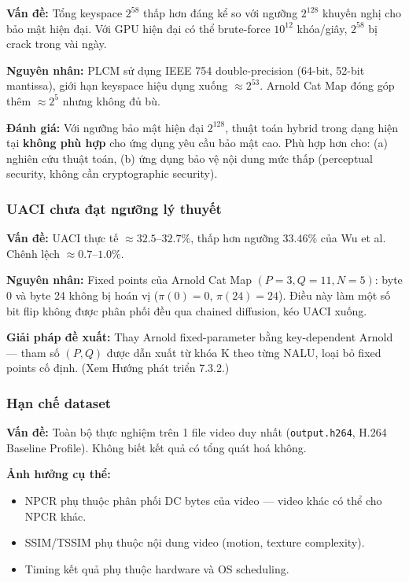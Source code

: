 \textbf{Vấn đề:} Tổng keyspace $2^{58}$ thấp hơn đáng kể so với ngưỡng $2^{128}$
khuyến nghị cho bảo mật hiện đại. Với GPU hiện đại có thể brute-force $10^{12}$
khóa/giây, $2^{58}$ bị crack trong vài ngày.

\textbf{Nguyên nhân:} PLCM sử dụng IEEE 754 double-precision (64-bit, 52-bit mantissa),
giới hạn keyspace hiệu dụng xuống $\approx 2^{53}$.
Arnold Cat Map đóng góp thêm $\approx 2^5$ nhưng không đủ bù.

\textbf{Đánh giá:} Với ngưỡng bảo mật hiện đại $2^{128}$, thuật toán hybrid
trong dạng hiện tại \textbf{không phù hợp} cho ứng dụng yêu cầu bảo mật cao.
Phù hợp hơn cho: (a) nghiên cứu thuật toán, (b) ứng dụng bảo vệ nội dung mức thấp
(perceptual security, không cần cryptographic security).

\subsubsection{UACI chưa đạt ngưỡng lý thuyết}

\textbf{Vấn đề:} UACI thực tế $\approx 32.5$--$32.7\%$, thấp hơn ngưỡng $33.46\%$
của Wu et al. Chênh lệch $\approx 0.7$--$1.0\%$.

\textbf{Nguyên nhân:} Fixed points của Arnold Cat Map $(P=3, Q=11, N=5)$:
byte 0 và byte 24 không bị hoán vị ($\pi(0) = 0$, $\pi(24) = 24$). Điều này
làm một số bit flip không được phân phối đều qua chained diffusion, kéo UACI xuống.

\textbf{Giải pháp đề xuất:} Thay Arnold fixed-parameter bằng key-dependent Arnold
--- tham số $(P, Q)$ được dẫn xuất từ khóa K theo từng NALU, loại bỏ fixed points
cố định. (Xem Hướng phát triển 7.3.2.)

\subsubsection{Hạn chế dataset}

\textbf{Vấn đề:} Toàn bộ thực nghiệm trên 1 file video duy nhất (\texttt{output.h264},
H.264 Baseline Profile). Không biết kết quả có tổng quát hoá không.

\textbf{Ảnh hưởng cụ thể:}
\begin{itemize}
  \item NPCR phụ thuộc phân phối DC bytes của video --- video khác có thể cho
        NPCR khác.
  \item SSIM/TSSIM phụ thuộc nội dung video (motion, texture complexity).
  \item Timing kết quả phụ thuộc hardware và OS scheduling.
\end{itemize}

